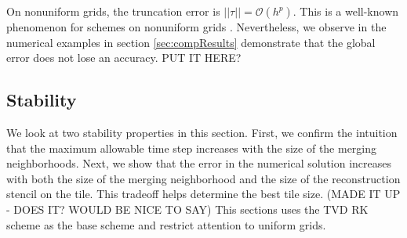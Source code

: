 On nonuniform grids, the truncation error is $||\tau|| = \mathcal{O}(h^{p})$.  
This is a well-known phenomenon for schemes on nonuniform grids \cite{}.
Nevertheless, we observe in the numerical examples in 
section \ref{sec:compResults} demonstrate that the global error does not lose an
accuracy. PUT IT HERE?

\subsection{Stability}
We look at two stability properties in this section. 
First, we confirm the intuition that the maximum allowable time step 
increases with the size of the merging neighborhoods.  
Next, we show that the error in the numerical solution increases with both the 
size of the merging neighborhood and the size of the reconstruction 
stencil on the tile. This tradeoff helps determine the best tile size.
(MADE IT UP - DOES IT? WOULD BE NICE TO SAY)
This sections uses the TVD RK scheme as the base scheme and restrict
attention to uniform grids.

